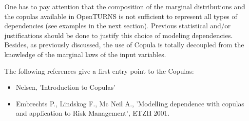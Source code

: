 {
  One has to pay attention that the composition of the marginal distributions and the copulas available in OpenTURNS is not sufficient to represent all types of dependencies (see examples in the next section). Previous statistical and/or justifications should be done to justify this choice of modeling  dependencies. Besides, as previously discussed, the use of Copula is totally decoupled from the knowledge of the marginal laws of the input variables.

  The following references give a first entry point to the Copulas:
  \begin{itemize}
  \item Nelsen, 'Introduction to Copulas'

  \item Embrechts P., Lindskog F., Mc Neil A., 'Modelling dependence with copulas and application to Risk Management', ETZH 2001.

  \end{itemize}
}

\Example{

  -
}
